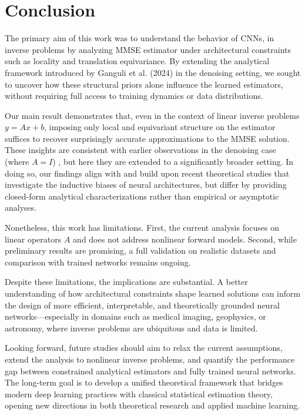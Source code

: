\documentclass[a4paper,10pt]{article}
\theoremstyle{definition} %
\theoremstyle{definition} %
\theoremstyle{definition} %
\theoremstyle{definition} %
\newcommand{\0}{\boldsymbol{0}}
\newcommand{\X}{\mathcal{X}}
\newcommand{\Y}{\mathcal{Y}}
\newcommand{\Tx}{T^{\X}}
\newcommand{\Ty}{T^{\Y}}
\begin{document}

\section{Conclusion}
The primary aim of this work was to understand the behavior of CNNs, in inverse problems by analyzing MMSE estimator under architectural constraints such as locality and translation equivariance. By extending the analytical framework introduced by Ganguli et al. (2024) \cite{kamb2024analytictheorycreativityconvolutional} in the denoising setting, we sought to uncover how these structural priors alone influence the learned estimators, without requiring full access to training dynamics or data distributions.

Our main result demonstrates that, even in the context of linear inverse problems $y=Ax+b$, imposing only local and equivariant structure on the estimator suffices to recover surprisingly accurate approximations to the MMSE solution. These insights are consistent with earlier observations in the denoising case (where $A=I$) \cite{kamb2024analytictheorycreativityconvolutional}, but here they are extended to a significantly broader setting. In doing so, our findings align with and build upon recent theoretical studies that investigate the inductive biases of neural architectures, but differ by providing closed-form analytical characterizations rather than empirical or asymptotic analyses.

Nonetheless, this work has limitations. First, the current analysis focuses on linear operators $A$ and does not address nonlinear forward models. Second, while preliminary results are promising, a full validation on realistic datasets and comparison with trained networks remains ongoing.

Despite these limitations, the implications are substantial. A better understanding of how architectural constraints shape learned solutions can inform the design of more efficient, interpretable, and theoretically grounded neural networks—especially in domains such as medical imaging, geophysics, or astronomy, where inverse problems are ubiquitous and data is limited.

Looking forward, future studies should aim to relax the current assumptions, extend the analysis to nonlinear inverse problems, and quantify the performance gap between constrained analytical estimators and fully trained neural networks. The long-term goal is to develop a unified theoretical framework that bridges modern deep learning practices with classical statistical estimation theory, opening new directions in both theoretical research and applied machine learning.
\end{document}
